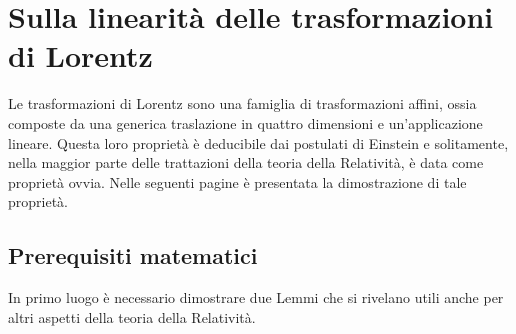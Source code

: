 \chapter{Sulla linearità delle trasformazioni di Lorentz}
Le trasformazioni di Lorentz sono una famiglia di trasformazioni affini, ossia composte 
da una generica traslazione in quattro dimensioni e un'applicazione lineare. 
Questa loro proprietà è deducibile dai postulati di Einstein e solitamente, nella maggior 
parte delle trattazioni della teoria della Relatività, è data come proprietà ovvia. 
Nelle seguenti pagine è presentata la dimostrazione di tale proprietà.\\

\section{Prerequisiti matematici}
In primo luogo è necessario dimostrare due Lemmi che si rivelano utili anche per altri 
aspetti della teoria della Relatività.

